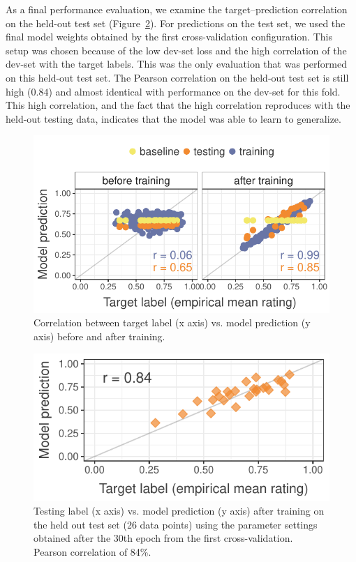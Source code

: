 \documentclass[11pt,a4paper]{article}
\begin{document}
As a final performance evaluation, we examine the target--prediction correlation on the held-out test set (Figure~\ref{fig:test-corr}). For predictions on the test set, we used the final model weights obtained by the first cross-validation configuration. This setup was chosen because of the low dev-set loss and the high correlation of the dev-set with the target labels. This was the only evaluation that was performed on this held-out test set. The Pearson correlation on the held-out test set is still high ($0.84$) and almost identical with performance on the dev-set for this fold. This high correlation, and the fact that the high correlation reproduces with the held-out testing data, indicates that the model was able to learn to generalize.

\begin{figure}
  \includegraphics[width=\linewidth]{graphs/cv0-pred-target-epoch0-29.pdf}
  \caption{Correlation between target label (x axis) vs. model prediction (y axis) before and after training.}
  \label{fig:corr-cv0}
\end{figure}

\begin{figure}
  \includegraphics[width=\linewidth]{graphs/test-corr.pdf}
  \caption{Testing label (x axis) vs. model prediction (y axis) after training on the held out test set (26 data points) using the parameter settings obtained after the 30th epoch from the first cross-validation. Pearson correlation of 84\%.}
  \label{fig:test-corr}
\end{figure}
\end{document}
